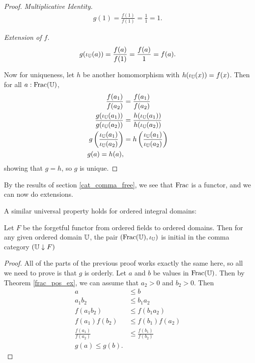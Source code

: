 \documentclass[../../math.tex]{subfiles}
\begin{document}
\begin{proof}
    \textit{Multiplicative Identity.}
    \begin{align*}
        g(1) = \frac{f(1)}{f(1)} = \frac{1}{1} = 1.
    \end{align*}

    \textit{Extension of $f$.}
    \begin{align*}
        g(\iota_{\mathbb{U}}(a)) = \frac{f(a)}{f(1)} = \frac{f(a)}{1} = f(a).
    \end{align*}

    Now for uniqueness, let $h$ be another homomorphism with $h(\iota_{\mathbb{U}}(x)) =
    f(x)$.  Then for all $a : \operatorname{Frac}(\mathbb{U})$,
    \begin{align*}
        \frac{f(a_1)}{f(a_2)} &= \frac{f(a_1)}{f(a_2)} \\
        \frac{g(\iota_{\mathbb{U}}(a_1))}{g(\iota_{\mathbb{U}}(a_2))} &=
            \frac{h(\iota_{\mathbb{U}}(a_1))}{h(\iota_{\mathbb{U}}(a_2))} \\
        g \left( \frac{\iota_{\mathbb{U}}(a_1)}{\iota_{\mathbb{U}}(a_2)} \right) &=
            h \left( \frac{\iota_{\mathbb{U}}(a_1)}{\iota_{\mathbb{U}}(a_2)} \right) \\
        g(a) = h(a),
    \end{align*}
    showing that $g = h$, so $g$ is unique.
\end{proof}

By the results of section \ref{cat_comma_free}, we see that $\operatorname{Frac}$ is a
functor, and we can now do extensions.

A similar universal property holds for ordered integral domains:

\begin{theorem}
    Let $F$ be the forgetful functor from ordered fields to ordered domains.
    Then for any given ordered domain $\mathbb{U}$, the pair $(\operatorname{Frac}(\mathbb{U}), \iota_{\mathbb{U}})$ is
    initial in the comma category $(\mathbb{U} \downarrow F)$
\end{theorem}
\begin{proof}
    All of the parts of the previous proof works exactly the same here, so all
    we need to prove is that $g$ is orderly.  Let $a$ and $b$ be values in
    $\operatorname{Frac}(\mathbb{U})$.  Then by Theorem \ref{frac_pos_ex}, we can assume that $a_2 >
    0$ and $b_2 > 0$.  Then
    \begin{align*}
        a &\leq b \\
        a_1b_2 &\leq b_1a_2 \\
        f(a_1b_2) &\leq f(b_1a_2) \\
        f(a_1)f(b_2) &\leq f(b_1)f(a_2) \\
        \frac{f(a_1)}{f(a_2)} &\leq \frac{f(b_1)}{f(b_2)} \\
        g(a) \leq g(b).
    \end{align*}
\end{proof}
\end{document}
